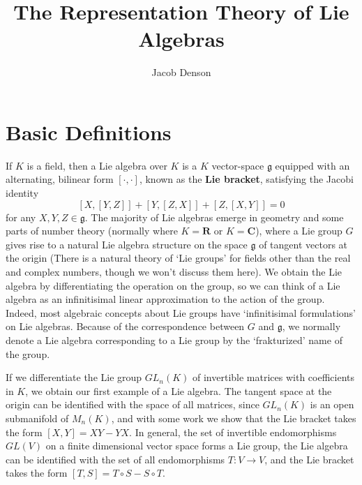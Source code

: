

\title{The Representation Theory of Lie Algebras}
\author{Jacob Denson}




\maketitle

\tableofcontents


\chapter{Basic Definitions}

If $K$ is a field, then a Lie algebra over $K$ is a $K$ vector-space $\mathfrak{g}$ equipped with an alternating, bilinear form $[\cdot, \cdot]$, known as the {\bf Lie bracket}, satisfying the Jacobi identity
%
\[ [X,[Y,Z]] + [Y,[Z,X]] + [Z,[X,Y]] = 0 \]
%
for any $X,Y,Z \in \mathfrak{g}$. The majority of Lie algebras emerge in geometry and some parts of number theory (normally where $K = \mathbf{R}$ or $K = \mathbf{C}$), where a Lie group $G$ gives rise to a natural Lie algebra structure on the space $\mathfrak{g}$ of tangent vectors at the origin (There is a natural theory of `Lie groups' for fields other than the real and complex numbers, though we won't discuss them here). We obtain the Lie algebra by differentiating the operation on the group, so we can think of a Lie algebra as an infinitisimal linear approximation to the action of the group. Indeed, most algebraic concepts about Lie groups have `infinitisimal formulations' on Lie algebras. Because of the correspondence between $G$ and $\mathfrak{g}$, we normally denote a Lie algebra corresponding to a Lie group by the `frakturized' name of the group.

\begin{example}
    If we differentiate the Lie group $GL_n(K)$ of invertible matrices with coefficients in $K$, we obtain our first example of a Lie algebra. The tangent space at the origin can be identified with the space of all matrices, since $GL_n(K)$ is an open submanifold of $M_n(K)$, and with some work we show that the Lie bracket takes the form $[X,Y] = XY - YX$. In general, the set of invertible endomorphisms $GL(V)$ on a finite dimensional vector space forms a Lie group, the Lie algebra can be identified with the set of all endomorphisms $T: V \to V$, and the Lie bracket takes the form $[T,S] = T \circ S - S \circ T$.
\end{example}

